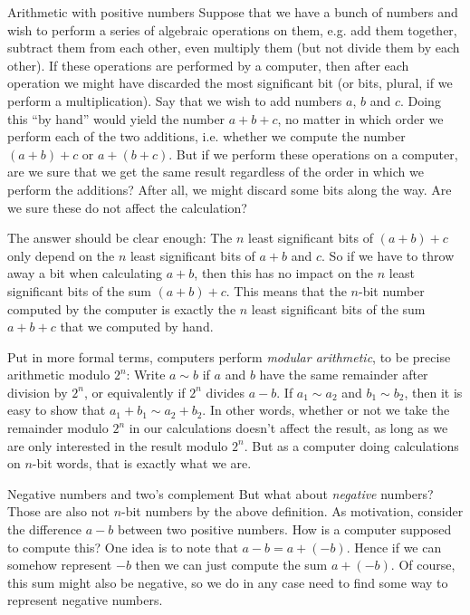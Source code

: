 \documentclass[article, a4paper, 11pt, oneside]{memoir}
\numberwithin{equation}{chapter}
\begin{document}
\begin{notelist}
\item[Arithmetic with positive numbers]
Suppose that we have a bunch of numbers and wish to perform a series of algebraic operations on them, e.g. add them together, subtract them from each other, even multiply them (but not divide them by each other). If these operations are performed by a computer, then after each operation we might have discarded the most significant bit (or bits, plural, if we perform a multiplication). Say that we wish to add numbers $a$, $b$ and $c$. Doing this \enquote{by hand} would yield the number $a+b+c$, no matter in which order we perform each of the two additions, i.e. whether we compute the number $(a+b)+c$ or $a+(b+c)$. But if we perform these operations on a computer, are we sure that we get the same result regardless of the order in which we perform the additions? After all, we might discard some bits along the way. Are we sure these do not affect the calculation?

The answer should be clear enough: The $n$ least significant bits of $(a+b)+c$ only depend on the $n$ least significant bits of $a+b$ and $c$. So if we have to throw away a bit when calculating $a+b$, then this has no impact on the $n$ least significant bits of the sum $(a+b)+c$. This means that the $n$-bit number computed by the computer is exactly the $n$ least significant bits of the sum $a+b+c$ that we computed by hand.

Put in more formal terms, computers perform \emph{modular arithmetic}, to be precise arithmetic modulo $2^n$: Write $a \sim b$ if $a$ and $b$ have the same remainder after division by $2^n$, or equivalently if $2^n$ divides $a - b$. If $a_1 \sim a_2$ and $b_1 \sim b_2$, then it is easy to show that $a_1 + b_1 \sim a_2 + b_2$. In other words, whether or not we take the remainder modulo $2^n$ in our calculations doesn't affect the result, as long as we are only interested in the result modulo $2^n$. But as a computer doing calculations on $n$-bit words, that is exactly what we are.

\item[Negative numbers and two's complement]
But what about \emph{negative} numbers? Those are also not $n$-bit numbers by the above definition. As motivation, consider the difference $a - b$ between two positive numbers. How is a computer supposed to compute this? One idea is to note that $a - b = a + (-b)$. Hence if we can somehow represent $-b$ then we can just compute the sum $a + (-b)$. Of course, this sum might also be negative, so we do in any case need to find some way to represent negative numbers.


\end{notelist}
\end{document}
